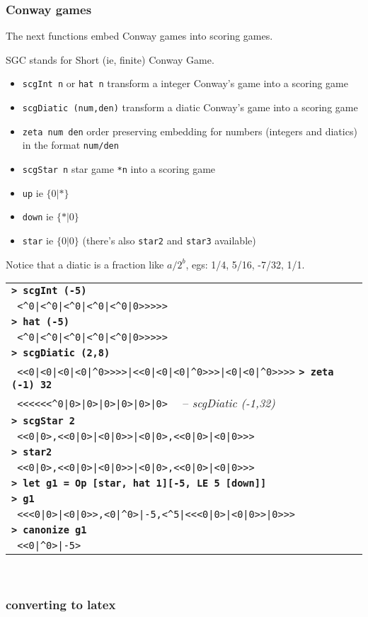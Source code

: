 \documentclass[a4paper,12pt]{article}
\newcommand{\bash}[1]{\small\textbf{\lstinline§> #1§}\\}
\newcommand{\out}[1]{\small\lstinline§ #1§}
\newcommand{\hsklcmt}[1]{~~-- \footnotesize\textit{#1}}
\newcommand{\haskellCode}{\fontfamily{pcr}\selectfont}
\newenvironment{sgcode}
	{ \haskellCode
	  \begin{tabular}{|p{0.9\textwidth}|}
      \hline	
	}
	{ \\\hline  
      \end{tabular} \\
	  \par 
	}
\begin{document}
\subsubsection{Conway games}

The next functions embed Conway games into scoring games.

SGC stands for Short (ie, finite) Conway Game.

\begin{itemize} \setlength\itemsep{0.1em}
  \item \verb|scgInt n| or \verb|hat n| transform a integer Conway's game into a scoring game
  \item \verb|scgDiatic (num,den)| transform a diatic Conway's game into a scoring game
  \item \verb|zeta num den| order preserving embedding for numbers (integers and diatics) in the format \verb|num/den|
  \item \verb|scgStar n| star game \verb|*n| into a scoring game
  \item \verb|up| ie $\{0|*\}$
  \item \verb|down| ie $\{*|0\}$
  \item \verb|star| ie $\{0|0\}$ (there's also \verb|star2| and \verb|star3| available)
\end{itemize}

Notice that a diatic is a fraction like $a/2^b$, egs: 1/4, 5/16, -7/32, 1/1.

\begin{sgcode}
\bash{scgInt (-5)}
\out{<^0|<^0|<^0|<^0|<^0|0>>>>>} \\
\bash{hat (-5)}
\out{<^0|<^0|<^0|<^0|<^0|0>>>>>} \\
\bash{scgDiatic (2,8)}
\out{<<0|<0|<0|<0|^0>>>>|<<0|<0|<0|^0>>>|<0|<0|^0>>>>}
\bash{zeta (-1) 32}
\out{<<<<<<^0|0>|0>|0>|0>|0>|0>} \hsklcmt{scgDiatic (-1,32)} \\
\bash{scgStar 2}
\out{<<0|0>,<<0|0>|<0|0>>|<0|0>,<<0|0>|<0|0>>>} \\
\bash{star2}
\out{<<0|0>,<<0|0>|<0|0>>|<0|0>,<<0|0>|<0|0>>>} \\
\bash{let g1 = Op [star, hat 1][-5, LE 5 [down]]}
\bash{g1}
\out{<<<0|0>|<0|0>>,<0|^0>|-5,<^5|<<<0|0>|<0|0>>|0>>>} \\
\bash{canonize g1}
\out{<<0|^0>|-5>}
\end{sgcode}

\subsubsection{converting to latex}
\end{document}

